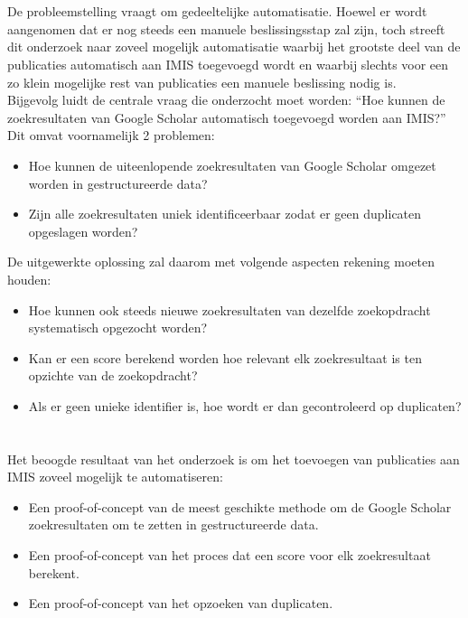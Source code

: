 \section{}%
\label{sec:onderzoeksvraag}

De probleemstelling vraagt om gedeeltelijke automatisatie. Hoewel er wordt aangenomen dat er nog steeds een manuele beslissingsstap zal zijn, toch streeft dit onderzoek naar zoveel mogelijk automatisatie waarbij het grootste deel van de publicaties automatisch aan IMIS toegevoegd wordt en waarbij slechts voor een zo klein mogelijke rest van publicaties een manuele beslissing nodig is.\\
Bijgevolg luidt de centrale vraag die onderzocht moet worden: ``Hoe kunnen de zoekresultaten van Google Scholar automatisch toegevoegd worden aan IMIS?''
Dit omvat voornamelijk 2 problemen:
\begin{itemize}
    \item Hoe kunnen de uiteenlopende zoekresultaten van Google Scholar omgezet worden in gestructureerde data?
    \item Zijn alle zoekresultaten uniek identificeerbaar zodat er geen duplicaten opgeslagen worden?
\end{itemize}
De uitgewerkte oplossing zal daarom met volgende aspecten rekening moeten houden:
\begin{itemize}
    \item Hoe kunnen ook steeds nieuwe zoekresultaten van dezelfde zoekopdracht systematisch opgezocht worden?
    \item Kan er een score berekend worden hoe relevant elk zoekresultaat is ten opzichte van de zoekopdracht?
    \item Als er geen unieke identifier is, hoe wordt er dan gecontroleerd op duplicaten? 
\end{itemize}

\section{}%
\label{sec:onderzoeksdoelstelling}

Het beoogde resultaat van het onderzoek is om het toevoegen van publicaties aan IMIS zoveel mogelijk te automatiseren:
\begin{itemize}
    \item Een proof-of-concept van de meest geschikte methode om de Google Scholar zoekresultaten om te zetten in gestructureerde data.
    \item Een proof-of-concept van het proces dat een score voor elk zoekresultaat berekent.
    \item Een proof-of-concept van het opzoeken van duplicaten.
\end{itemize}

